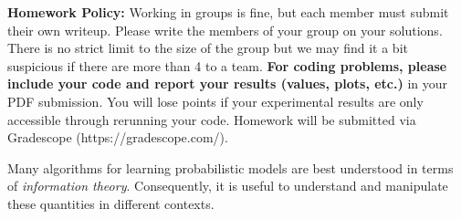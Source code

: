 \documentclass{abernethy_hw}
\begin{document}
\maketitle
\textbf{Homework Policy:} Working in groups is fine, but each member must submit their own writeup. Please write the members of your group on your solutions. There is no strict limit to the size of the group but we may find it a bit suspicious if there are more than 4 to a team. \textbf{For coding problems, please include your code and report your results (values, plots, etc.)} in your PDF submission. You will lose points if your experimental results are only accessible through rerunning your code. Homework will be submitted via Gradescope (https://gradescope.com/).
\vspace{1em}


Many algorithms for learning probabilistic models are best understood in terms of \textit{information theory}.  Consequently, it is useful to understand and manipulate these quantities in different contexts.



\end{document}
